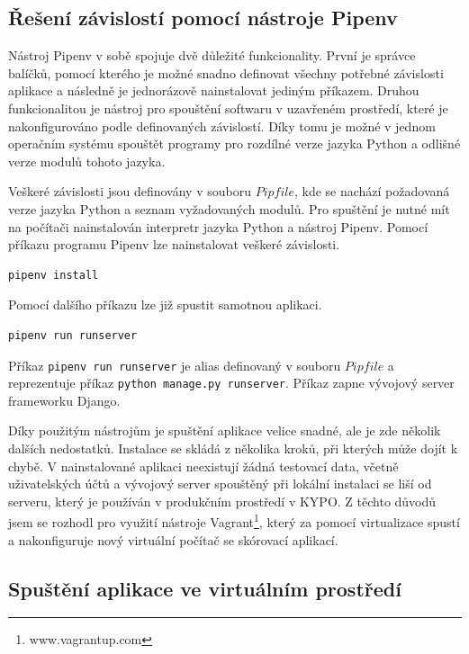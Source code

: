 \documentclass[
  digital, %
  twoside, %
  table,   %
  lof,     %
  lot,     %
]{fithesis3}
\begin{document}
\subsection{Řešení závislostí pomocí nástroje Pipenv}
Nástroj Pipenv v sobě spojuje dvě důležité funkcionality. První je správce balíčků, pomocí kterého je možné snadno definovat všechny potřebné závislosti aplikace a následně je jednorázově nainstalovat jediným příkazem. Druhou funkcionalitou je nástroj pro spouštění softwaru v uzavřeném prostředí, které je nakonfigurováno podle definovaných závislostí. Díky tomu je možné v jednom operačním systému spouštět programy pro rozdílné verze jazyka Python a odlišné verze modulů tohoto jazyka.

Veškeré závislosti jsou definovány v souboru $Pipfile$, kde se nachází požadovaná verze jazyka Python a seznam vyžadovaných modulů. Pro spuštění je nutné mít na počítači nainstalován interpretr jazyka Python a nástroj Pipenv. Pomocí příkazu programu Pipenv lze nainstalovat veškeré závislosti.

\begin{lstlisting}
pipenv install
\end{lstlisting}

Pomocí dalšího příkazu lze již spustit samotnou aplikaci.

\begin{lstlisting}
pipenv run runserver
\end{lstlisting}

Příkaz \lstinline[columns=fixed]{pipenv run runserver} je alias definovaný v souboru $Pipfile$ a reprezentuje příkaz \lstinline[columns=fixed]{python manage.py runserver}. Příkaz zapne vývojový server frameworku Django.

Díky použitým nástrojům je spuštění aplikace velice snadné, ale je zde několik dalších nedostatků. Instalace se skládá z několika kroků, při kterých může dojít k chybě. V nainstalované aplikaci neexistují žádná testovací data, včetně uživatelských účtů a vývojový server spouštěný při lokální instalaci se liší od serveru, který je používán v produkčním prostředí v KYPO. Z těchto důvodů jsem se rozhodl pro využití nástroje Vagrant\footnote{www.vagrantup.com}, který za pomocí virtualizace spustí a nakonfiguruje nový virtuální počítač se skórovací aplikací.

\subsection{Spuštění aplikace ve virtuálním prostředí}
\end{document}

